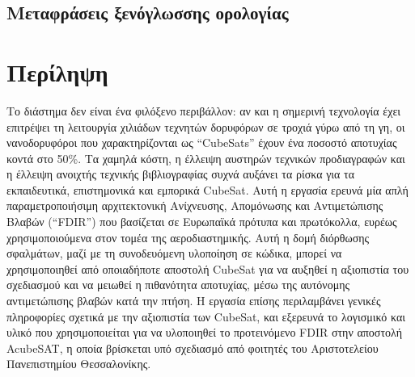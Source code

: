 \documentclass[a4paper,nobib]{tufte-book}
\begin{document}
\begin{fullwidth}
\listoffigures

\listoftables

\chapter*{Μεταφράσεις ξενόγλωσσης ορολογίας}

\bgroup
\setlength\parskip{1.5ex}
\acuseall
\printacronyms[include=glossary,template=glossary]
\acresetall  %
\egroup

\bgroup
\setlength\parskip{1ex}
\printacronyms[pages={display=all,seq/use=false},exclude = {glossary}]
\egroup

\end{fullwidth}

\cleardoublepage

\chapter*{Περίληψη}


\justify
Το διάστημα δεν είναι ένα φιλόξενο περιβάλλον: αν και η σημερινή τεχνολογία έχει επιτρέψει τη λειτουργία χιλιάδων τεχνητών δο\-ρυ\-φό\-ρων σε τροχιά γύρω από τη γη, οι νανοδορυφόροι που χαρακτηρίζονται ως “CubeSats” έχουν ένα ποσοστό αποτυχίας κοντά στο 50\%. Τα χαμηλά κόστη, η έλλειψη αυστηρών τεχνικών προδιαγραφών και η έλλειψη ανοιχτής τεχνικής βιβλιογραφίας συχνά αυξάνει τα ρίσκα για τα εκπαιδευτικά, επιστημονικά και εμπορικά CubeSat. Αυτή η εργασία ερευνά μία απλή παραμετροποιήσιμη αρχιτεκτονική Ανίχνευσης, Απομόνωσης και Αντιμετώπισης Βλαβών (“FDIR”) που βασίζεται σε Ευρωπαϊκά πρότυπα και πρωτόκολλα, ευρέως χρησιμοποιούμενα στον τομέα της αεροδιαστημικής. Αυτή η δομή διόρθωσης σφαλμάτων, μαζί με τη συνοδευόμενη υλοποίηση σε κώδικα, μπορεί να χρησιμοποιηθεί από οποιαδήποτε αποστολή CubeSat για να αυξηθεί η αξιοπιστία του σχεδιασμού και να μειωθεί η πιθανότητα αποτυχίας, μέσω της αυτόνομης αντιμετώπισης βλαβών κατά την πτήση. Η εργασία επίσης περιλαμβάνει γενικές πληροφορίες σχετικά με την αξιοπιστία των CubeSat, και εξερευνά το λογισμικό και υλικό που χρησιμοποιείται για να υλοποιηθεί το προτεινόμενο FDIR στην αποστολή AcubeSAT, η οποία βρίσκεται υπό σχεδιασμό από φοιτητές του Αριστοτελείου Πανεπιστημίου Θεσσαλονίκης.
\end{document}
